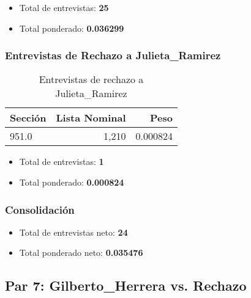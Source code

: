 \documentclass[a4paper,12pt]{article}
\begin{document}
\begin{itemize}
\item Total de entrevistas: \textbf{25}
\item Total ponderado: \textbf{0.036299}
\end{itemize}

\subsubsection*{Entrevistas de Rechazo a Julieta_Ramirez}
\begin{table}[h]
\centering
\begin{tabular}{lrr}
\toprule
Sección & Lista Nominal & Peso \\ \midrule
951.0 & 1,210 & 0.000824 \\ 
\bottomrule
\end{tabular}
\caption{Entrevistas de rechazo a Julieta_Ramirez}
\end{table}

\begin{itemize}
\item Total de entrevistas: \textbf{1}
\item Total ponderado: \textbf{0.000824}
\end{itemize}

\subsubsection*{Consolidación}
\begin{itemize}
\item Total de entrevistas neto: \textbf{24}
\item Total ponderado neto: \textbf{0.035476}
\end{itemize}

\subsection*{Par 7: Gilberto_Herrera vs. Rechazo}
\end{document}
